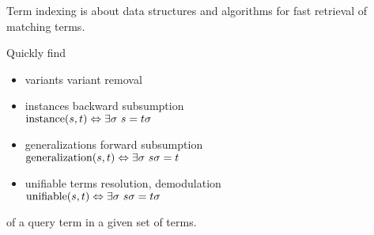 \begin{definition}
	Term indexing is about data structures and algorithms
	for fast retrieval of matching terms.
		\item
		Quickly find
		\begin{itemize}
			\item {variants} \hfill{\footnotesize variant removal}

			\item {instances}   \hfill{\footnotesize backward subsumption}\\
			\( \operatorname{instance}(s,t)\Leftrightarrow\exists\sigma\ s = t\sigma \)

			\item {generalizations}  \hfill{\footnotesize forward subsumption}\\
			\( \GNRL(s,t)\Leftrightarrow\exists\sigma\ s\sigma = t \)

			\item {unifiable terms} \hfill{\footnotesize resolution, demodulation}\\
			\( \UNIF(s,t)\Leftrightarrow\exists\sigma\ s\sigma = t\sigma \)

		\end{itemize}

		of a query term in a given set of terms.
\end{definition}




